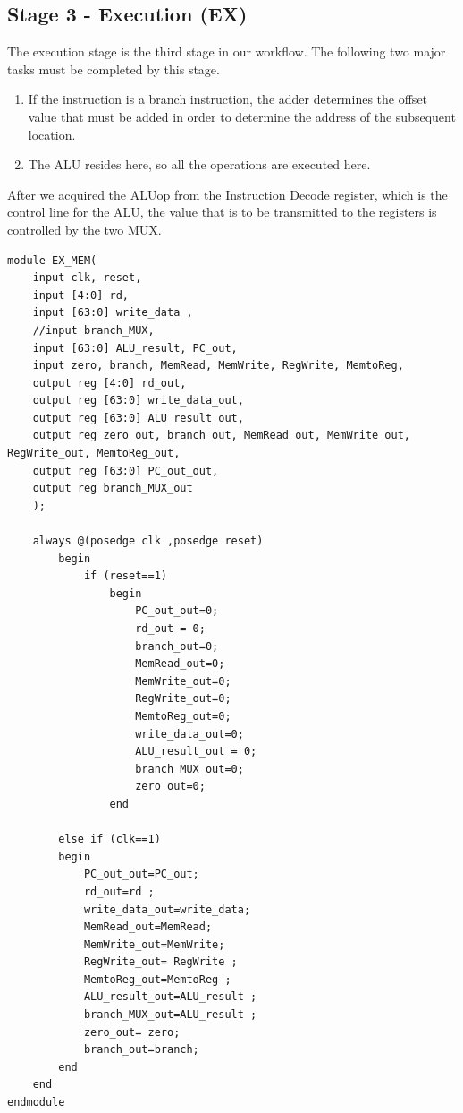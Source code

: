 \documentclass{article}
\begin{document}
\subsection{Stage 3 - Execution (EX)}
The execution stage is the third stage in our workflow. The following two major tasks must be completed by this stage. 

\begin{enumerate}
    \item If the instruction is a branch instruction, the adder determines the offset value that must be added in order to determine the address of the subsequent location.
    \item The ALU resides here, so all the operations are executed here.
\end{enumerate}

After we acquired the ALUop from the Instruction Decode register, which is the control line for the ALU, the value that is to be transmitted to the registers is controlled by the two MUX. 

\begin{lstlisting}[caption={EX/MEM Register}, captionpos=b, language=RISC-V]
module EX_MEM(
    input clk, reset,
    input [4:0] rd,
    input [63:0] write_data , 
    //input branch_MUX,
    input [63:0] ALU_result, PC_out,
    input zero, branch, MemRead, MemWrite, RegWrite, MemtoReg, 
    output reg [4:0] rd_out,
    output reg [63:0] write_data_out, 
    output reg [63:0] ALU_result_out, 
    output reg zero_out, branch_out, MemRead_out, MemWrite_out, RegWrite_out, MemtoReg_out, 
    output reg [63:0] PC_out_out,
    output reg branch_MUX_out
    );

    always @(posedge clk ,posedge reset)
        begin
            if (reset==1)
                begin
                    PC_out_out=0;
                    rd_out = 0;
                    branch_out=0;
                    MemRead_out=0;
                    MemWrite_out=0;
                    RegWrite_out=0;
                    MemtoReg_out=0;
                    write_data_out=0; 
                    ALU_result_out = 0;
                    branch_MUX_out=0;
                    zero_out=0;
                end

        else if (clk==1)
        begin
            PC_out_out=PC_out;
            rd_out=rd ;
            write_data_out=write_data; 
            MemRead_out=MemRead;
            MemWrite_out=MemWrite;
            RegWrite_out= RegWrite ;
            MemtoReg_out=MemtoReg ;
            ALU_result_out=ALU_result ;
            branch_MUX_out=ALU_result ;
            zero_out= zero;
            branch_out=branch;  
        end
    end
endmodule

\end{lstlisting}
\end{document}

